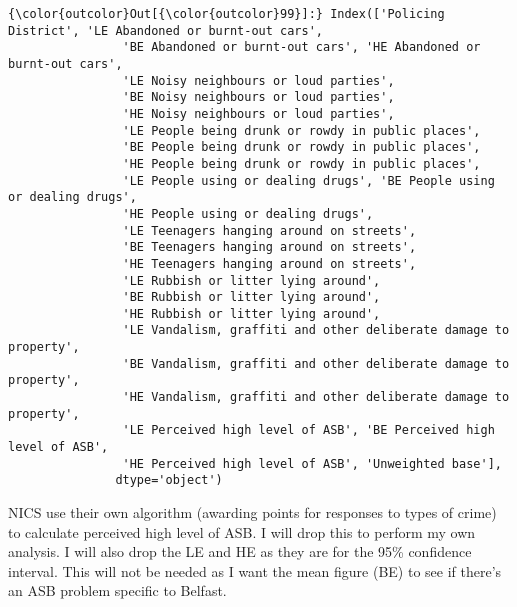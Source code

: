 \documentclass[11pt]{article}
\begin{document}
\begin{Verbatim}[commandchars=\\\{\}]
{\color{outcolor}Out[{\color{outcolor}99}]:} Index(['Policing District', 'LE Abandoned or burnt-out cars',
                'BE Abandoned or burnt-out cars', 'HE Abandoned or burnt-out cars',
                'LE Noisy neighbours or loud parties',
                'BE Noisy neighbours or loud parties',
                'HE Noisy neighbours or loud parties',
                'LE People being drunk or rowdy in public places',
                'BE People being drunk or rowdy in public places',
                'HE People being drunk or rowdy in public places',
                'LE People using or dealing drugs', 'BE People using or dealing drugs',
                'HE People using or dealing drugs',
                'LE Teenagers hanging around on streets',
                'BE Teenagers hanging around on streets',
                'HE Teenagers hanging around on streets',
                'LE Rubbish or litter lying around',
                'BE Rubbish or litter lying around',
                'HE Rubbish or litter lying around',
                'LE Vandalism, graffiti and other deliberate damage to property',
                'BE Vandalism, graffiti and other deliberate damage to property',
                'HE Vandalism, graffiti and other deliberate damage to property',
                'LE Perceived high level of ASB', 'BE Perceived high level of ASB',
                'HE Perceived high level of ASB', 'Unweighted base'],
               dtype='object')
\end{Verbatim}
            
     NICS use their own algorithm (awarding points for responses to types of
crime) to calculate perceived high level of ASB. I will drop this to
perform my own analysis. I will also drop the LE and HE as they are for
the 95\% confidence interval. This will not be needed as I want the mean
figure (BE) to see if there's an ASB problem specific to Belfast. 
\end{document}
